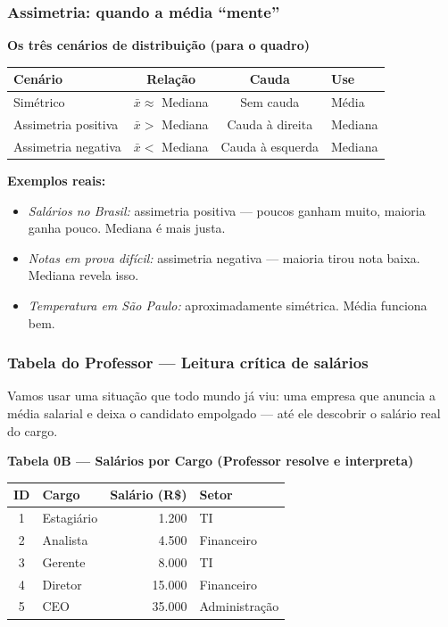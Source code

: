 \subsubsection*{Assimetria: quando a média ``mente''}

\begin{BoardBox}
\textbf{Os três cenários de distribuição (para o quadro)}

\begin{tabular}{|l|c|c|l|}
\hline
\textbf{Cenário} & \textbf{Relação} & \textbf{Cauda} & \textbf{Use} \\
\hline
Simétrico           & $\bar{x} \approx$ Mediana & Sem cauda       & Média    \\
Assimetria positiva & $\bar{x} >$ Mediana       & Cauda à direita & Mediana  \\
Assimetria negativa & $\bar{x} <$ Mediana       & Cauda à esquerda & Mediana \\
\hline
\end{tabular}

\medskip
\textbf{Exemplos reais:}
\begin{itemize}
  \item \textit{Salários no Brasil:} assimetria positiva — poucos ganham muito,
  maioria ganha pouco. Mediana é mais justa.
  \item \textit{Notas em prova difícil:} assimetria negativa — maioria tirou
  nota baixa. Mediana revela isso.
  \item \textit{Temperatura em São Paulo:} aproximadamente simétrica. Média
  funciona bem.
\end{itemize}
\end{BoardBox}

\subsubsection*{Tabela do Professor — Leitura crítica de salários}

Vamos usar uma situação que todo mundo já viu: uma empresa que anuncia a média
salarial e deixa o candidato empolgado — até ele descobrir o salário real do
cargo.

\begin{BoardBox}
\textbf{Tabela 0B — Salários por Cargo (Professor resolve e interpreta)}
\begin{tabular}{|c|l|r|l|}
\hline
\textbf{ID} & \textbf{Cargo} & \textbf{Salário (R\$)} & \textbf{Setor} \\
\hline
1 & Estagiário &  1.200 & TI            \\
2 & Analista   &  4.500 & Financeiro    \\
3 & Gerente    &  8.000 & TI            \\
4 & Diretor    & 15.000 & Financeiro    \\
5 & CEO        & 35.000 & Administração \\
\hline
\end{tabular}
\end{BoardBox}

